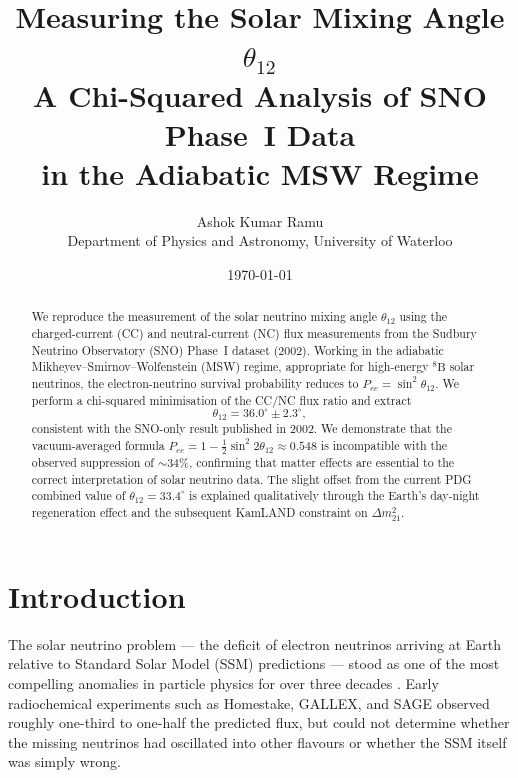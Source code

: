 \documentclass[12pt, a4paper]{article}
\title{%
    \textbf{Measuring the Solar Mixing Angle $\theta_{12}$}\\[4pt]
    \large A Chi-Squared Analysis of SNO Phase~I Data\\
    in the Adiabatic MSW Regime
}
\author{Ashok Kumar Ramu\\[2pt]
    \small Department of Physics and Astronomy, University of Waterloo}
\date{\today}
\begin{document}
\maketitle
 
\begin{abstract}
We reproduce the measurement of the solar neutrino mixing angle $\theta_{12}$
using the charged-current (CC) and neutral-current (NC) flux measurements from
the Sudbury Neutrino Observatory (SNO) Phase~I dataset (2002).
Working in the adiabatic Mikheyev--Smirnov--Wolfenstein (MSW) regime,
appropriate for high-energy ${}^8\text{B}$ solar neutrinos,
the electron-neutrino survival probability reduces to
$P_{ee} = \sin^2\theta_{12}$.
We perform a chi-squared minimisation of the CC/NC flux ratio and extract
\[
    \theta_{12} = 36.0^{\circ} \pm 2.3^{\circ},
\]
consistent with the SNO-only result published in 2002.
We demonstrate that the vacuum-averaged formula
$P_{ee} = 1 - \tfrac{1}{2}\sin^2 2\theta_{12} \approx 0.548$
is incompatible with the observed suppression of $\sim\!34\%$,
confirming that matter effects are essential to the correct interpretation
of solar neutrino data.
The slight offset from the current PDG combined value of
$\theta_{12} = 33.4^{\circ}$ is explained qualitatively through
the Earth's day-night regeneration effect and the subsequent KamLAND
constraint on $\Delta m^2_{21}$.
\end{abstract}

\newpage 
\tableofcontents
\newpage
 
\section{Introduction}
\label{sec:intro}
 
The solar neutrino problem --- the deficit of electron neutrinos arriving at
Earth relative to Standard Solar Model (SSM) predictions --- stood as one of
the most compelling anomalies in particle physics for over three decades
\cite{Homestake1968, Bahcall1989}.
Early radiochemical experiments such as Homestake, GALLEX, and SAGE observed
roughly one-third to one-half the predicted flux, but could not determine
whether the missing neutrinos had oscillated into other flavours or whether
the SSM itself was simply wrong.
 
\end{document}
